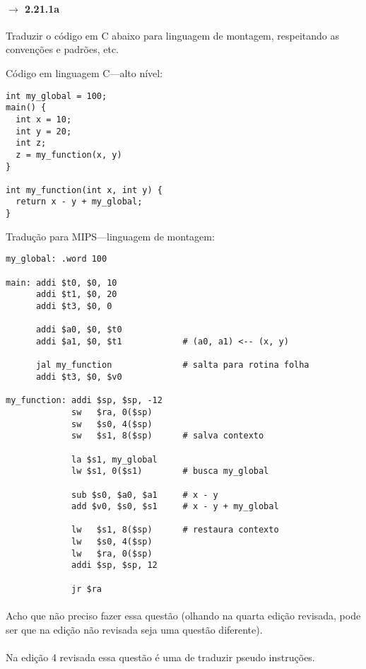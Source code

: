 \documentclass{article}
\begin{document}
\paragraph{ $\rightarrow$ 2.21.1a} Traduzir o código em C abaixo 
para linguagem de montagem, respeitando as convenções e padrões, etc.

Código em linguagem C---alto nível:

\begin{verbatim}
int my_global = 100;
main() {
  int x = 10;
  int y = 20;
  int z;
  z = my_function(x, y)
}

int my_function(int x, int y) {
  return x - y + my_global;
}
\end{verbatim}

Tradução para MIPS---linguagem de montagem:

\begin{verbatim}
my_global: .word 100

main: addi $t0, $0, 10
      addi $t1, $0, 20
      addi $t3, $0, 0

      addi $a0, $0, $t0
      addi $a1, $0, $t1            # (a0, a1) <-- (x, y)

      jal my_function              # salta para rotina folha
      addi $t3, $0, $v0

my_function: addi $sp, $sp, -12
             sw   $ra, 0($sp)
             sw   $s0, 4($sp)
             sw   $s1, 8($sp)      # salva contexto

             la $s1, my_global
             lw $s1, 0($s1)        # busca my_global

             sub $s0, $a0, $a1     # x - y
             add $v0, $s0, $s1     # x - y + my_global

             lw   $s1, 8($sp)      # restaura contexto
             lw   $s0, 4($sp)
             lw   $ra, 0($sp)
             addi $sp, $sp, 12

             jr $ra
\end{verbatim}

\paragraph{} Acho que não preciso fazer essa questão (olhando na 
quarta edição revisada, pode ser que na edição não revisada seja uma questão 
diferente).

\paragraph{} Na edição 4 revisada essa questão é uma de traduzir 
pseudo instruções.
\end{document}
